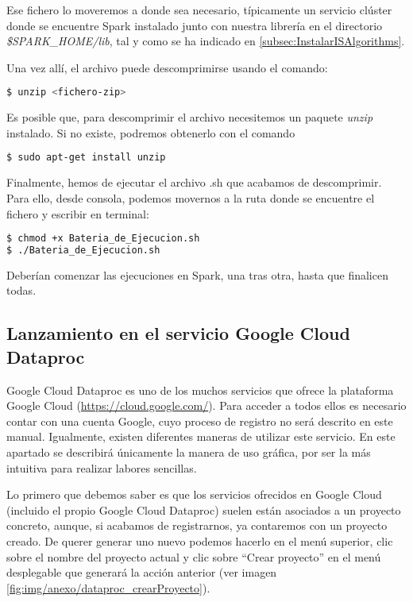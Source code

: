 Ese fichero lo moveremos a donde sea necesario, típicamente un servicio clúster donde se encuentre Spark instalado junto con nuestra librería en el directorio \textit{\$SPARK\_HOME/lib}, tal y como se ha indicado en \ref{subsec:InstalarISAlgorithms}.

Una vez allí, el archivo puede descomprimirse usando el comando: 

\begin{lstlisting}[language=bash]
$ unzip <fichero-zip>
\end{lstlisting}

Es posible que, para descomprimir el archivo necesitemos un paquete \textit{unzip} instalado. Si no existe, podremos obtenerlo con el comando

\begin{lstlisting}[language=bash]
$ sudo apt-get install unzip
\end{lstlisting}

Finalmente, hemos de ejecutar el archivo .sh que acabamos de descomprimir. Para ello, desde consola, podemos movernos a la ruta donde se encuentre el fichero y escribir en terminal:

\begin{lstlisting}[language=bash]
$ chmod +x Bateria_de_Ejecucion.sh
$ ./Bateria_de_Ejecucion.sh
\end{lstlisting}

Deberían comenzar las ejecuciones en Spark, una tras otra, hasta que finalicen todas.

\subsection{Lanzamiento en el servicio Google Cloud Dataproc}

Google Cloud Dataproc es uno de los muchos servicios que ofrece la plataforma Google Cloud (\url{https://cloud.google.com/}). Para acceder a todos ellos es necesario contar con una cuenta Google, cuyo proceso de registro no será descrito en este manual. Igualmente, existen diferentes maneras de utilizar este servicio. En este apartado se describirá únicamente la manera de uso gráfica, por ser la más intuitiva para realizar labores sencillas.

Lo primero que debemos saber es que los servicios ofrecidos en Google Cloud (incluido el propio Google Cloud Dataproc) suelen están asociados a un proyecto concreto, aunque, si acabamos de registrarnos, ya contaremos con un proyecto creado. De querer generar uno nuevo podemos hacerlo en el menú superior, clic sobre el nombre del proyecto actual y clic sobre ``Crear proyecto'' en el menú desplegable que generará la acción anterior (ver imagen \ref{fig:img/anexo/dataproc_crearProyecto}).

